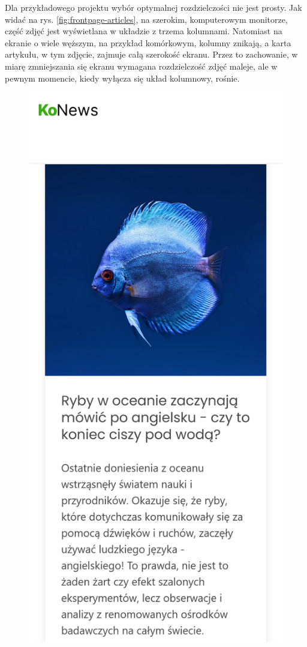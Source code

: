 \documentclass[licencjacka]{pracadypl}
\begin{document}
Dla przykładowego projektu wybór optymalnej rozdzielczości nie jest prosty. Jak widać na rys. \ref{fig:frontpage-articles}, na szerokim, komputerowym monitorze, część zdjęć jest wyświetlana w układzie z trzema kolumnami. Natomiast na ekranie o wiele węższym, na przykład komórkowym, kolumny znikają, a karta artykułu, w tym zdjęcie, zajmuje całą szerokość ekranu. Przez to zachowanie, w miarę zmniejszania się ekranu wymagana rozdzielczość zdjęć maleje, ale \linebreak w pewnym momencie, kiedy wyłącza się układ kolumnowy, rośnie.

\begin{figure}[H]
  \centering
  \includegraphics[width=\linewidth/\real{4}]{images/screenshot-iphone11.png}

\end{figure}
\end{document}

